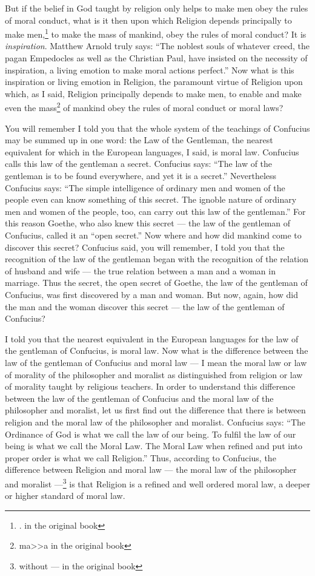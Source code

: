 But if the belief in God taught by religion only helps to make men obey the rules of moral conduct, what is it then upon which Religion depends principally to make men,\footnote{. in the original book} to make the mass of mankind, obey the rules of moral conduct?
It is \emph{inspiration}. Matthew Arnold truly says: ``The  noblest souls of whatever creed, the pagan Empedocles as well as the Christian Paul, have insisted on the necessity of inspiration, a living emotion to make moral actions perfect.''
Now what is this inspiration or living emotion in Religion, the paramount virtue of Religion upon which, as I said, Religion principally depends to make men, to enable and make even the mass\footnote{ma>>a in the original book} of mankind obey the rules of moral conduct or moral laws?

You will remember I told you that the whole system of the teachings of Confucius  may be summed up in one word: the Law of the Gentleman, the nearest equivalent for which in the European languages, I said, is moral law.
Confucius calls this law of the gentleman a secret\cite{num18}.
Confucius says: ``The law of the gentleman is to be found everywhere, and yet it is a secret.''
Nevertheless Confucius says: ``The simple intelligence of ordinary men and women of the people even can know something of this secret. The ignoble nature of ordinary men and women of the people, too, can carry out this law of the gentleman.''
For this reason Goethe, who also knew this secret --- the law of the gentleman of Confucius, called it an ``open secret.''
Now where and how did mankind come to discover this secret?
Confucius said, you will remember, I told you that the recognition of the law of the gentleman began with the recognition of the relation of husband and wife --- the true relation between a man and a woman in marriage.
Thus the secret, the open secret of Goethe, the law of the gentleman of Confucius, was first discovered by a man and woman.
But now, again, how did the man and the woman discover this secret --- the law of the gentleman of Confucius?

I told you that the nearest equivalent in the European languages for the law of the gentleman of Confucius, is moral law.
Now what is the difference between the law of the gentleman of Confucius and moral law --- I mean the moral law or law of morality of the philosopher and moralist as distinguished from religion or law of morality taught by religious teachers.
In order to understand this difference between the law of the gentleman of Confucius and the moral law of the philosopher and moralist, let us first find out the difference that there is between religion and the moral law of the philosopher and moralist.
Confucius says: ``The Ordinance of God is what we call the law of our being. To fulfil the law of our being is what we call the Moral Law. The Moral Law when refined and put into proper order is what we call Religion.''\cite{num19}
Thus, according to Confucius, the difference between Religion and moral law --- the moral law of the philosopher and moralist ---\footnote{without --- in the original book} is that Religion is a refined and well ordered moral law, a deeper or higher standard of moral law.

